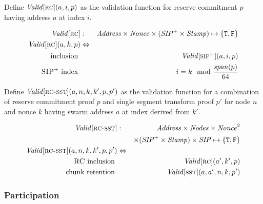 \begin{definition}
\label{def:RC-proof-validity}
Define $\mathit{Valid}[\textsc{\lowercase{RC}}](a, i, p)$ as the validation function for reserve commitment $p$ having address $a$ at index $i$.

\begin{eqnarray}
\mathit{Valid}[\textsc{\lowercase{RC}}]&:&\mathit{Address}\times\mathit{Nonce}\times(\mathit{SIP}^{+}\times\mathit{Stamp})\mapsto\{\mathtt{T,F}\}\\
\mathit{Valid}[\textsc{\lowercase{RC}}](a,k,p)&\Leftrightarrow&\\
\text{inclusion } && \mathit{Valid}[\textsc{\lowercase{SIP}}^{+}](a,i,p)\\
\textsc{SIP}^{+}\text{ index } && i=k \mod \frac{\mathit{span}(p)}{64}
\end{eqnarray}
\end{definition}


\begin{definition}
\label{def:RC-retention-proof-validity}
Define $\mathit{Valid}[\textsc{\lowercase{RC-SST}}](a, n, k, k', p, p')$ as the validation function for a combination of reserve commitment proof $p$ and single segment transform proof $p'$ for node $n$ and nonce $k$ having swarm address $a$ at index derived from $k'$.

\begin{eqnarray}
\mathit{Valid}[\textsc{\lowercase{RC-SST}}]&:&\mathit{Address}\times\mathit{Nodes}\times\mathit{Nonce}^2\\
&&\times(\mathit{SIP}^{+}\times\mathit{Stamp})\times\mathit{SIP}\mapsto\{\mathtt{T,F}\}\\
\mathit{Valid}[\textsc{\lowercase{RC-SST}}](a, n, k, k', p, p')&\Leftrightarrow&\\
\text{{\sc RC} inclusion } && \mathit{Valid}[\textsc{\lowercase{RC}}](a',k',p)\\
\text{chunk retention } && \mathit{Valid}[\textsc{\lowercase{SST}}](a,a',n,k,p')
\end{eqnarray}
\end{definition}


\subsubsection{Participation}

